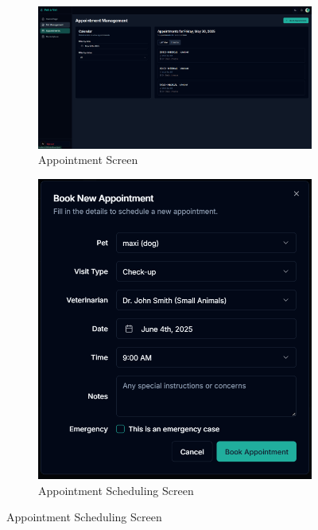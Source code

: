\documentclass[12pt,a4paper,twoside]{book}
\begin{document}
\begin{figure}[H]
    \centering
    \begin{subfigure}[b]{0.48\textwidth}
        \centering
        \includegraphics[width=\textwidth]{Resources/Final UI/appointments.png}
        \caption{Appointment Screen}\label{fig:appointment-screen}
    \end{subfigure}
    \hfill
    \begin{subfigure}[b]{0.48\textwidth}
        \centering
        \includegraphics[width=\textwidth]{Resources/Final UI/appointment-scheduling.png}
        \caption{Appointment Scheduling Screen}\label{fig:appointment-scheduling-screen}
    \end{subfigure}
\end{figure}
\end{document}

